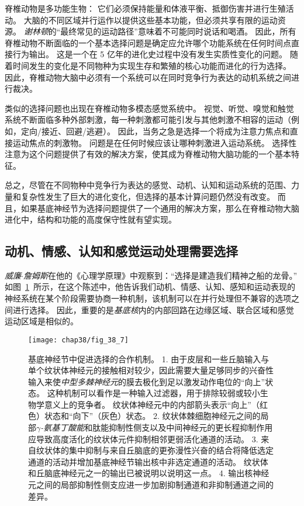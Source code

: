 脊椎动物是多功能生物：
它们必须保持能量和体液平衡、抵御伤害并进行生殖活动。
大脑的不同区域并行运作以提供这些基本功能，但必须共享有限的运动资源。
\textit{谢林顿}的“最终常见的运动路径”意味着不可能同时说话和喝酒。
因此，所有脊椎动物不断面临的一个基本选择问题是确定应允许哪个功能系统在任何时间点直接行为输出。
这是一个在 5 亿年的进化史过程中没有发生实质性变化的问题。
随着时间发生的变化是不同物种为实现生存和繁殖的核心功能而进化的行为选择。
因此，脊椎动物大脑中必须有一个系统可以在同时竞争行为表达的动机系统之间进行裁决。


类似的选择问题也出现在脊椎动物多模态感觉系统中。
视觉、听觉、嗅觉和触觉系统不断面临多种外部刺激，每一种刺激都可能引发与其他刺激不相容的运动（例如，定向/接近、回避/逃避）。
因此，当务之急是选择一个将成为注意力焦点和直接运动焦点的刺激物。
问题是在任何时候应该让哪种刺激进入运动系统。
选择性注意为这个问题提供了有效的解决方案，使其成为脊椎动物大脑功能的一个基本特征。


总之，尽管在不同物种中竞争行为表达的感觉、动机、认知和运动系统的范围、力量和复杂性发生了巨大的进化变化，但选择的基本计算问题仍然没有改变。
而且，如果基底神经节为选择问题提供了一个通用的解决方案，那么在脊椎动物大脑进化中，结构和功能的高度保守性就有望实现。



\subsection{动机、情感、认知和感觉运动处理需要选择}

\textit{威廉$\cdot$詹姆斯}在他的《心理学原理》中观察到：“选择是建造我们精神之船的龙骨。” 
如图~\ref{fig:38_7}~所示，在这个陈述中，他告诉我们动机、情感、认知、感知和运动表现的神经系统在某个阶段需要协商一种机制，该机制可以在并行处理但不兼容的选项之间进行选择。
因此，重要的是\textit{基底核}内的内部回路在边缘区域、联合区域和感觉运动区域是相似的。


\begin{figure}[htbp]
	\centering
	\texttt{[image: chap38/fig\_38\_7]}
	\caption{基底神经节中促进选择的合作机制。
		1. 由于皮层和一些丘脑输入与单个纹状体神经元的接触相对较少，因此需要大量足够同步的兴奋性输入来使\textit{中型多棘神经元}的膜去极化到足以激发动作电位的“向上”状态。
		这种机制可以看作是一种输入过滤器，用于排除较弱或较小生物学意义上的竞争者。
		纹状体神经元中的内部箭头表示“向上”（红色）状态和“向下”（灰色）状态。
		2. 纹状体棘细胞神经元之间的局部\textit{$\gamma$-氨基丁酸能}和肽能抑制性侧支以及中间神经元的更长程抑制作用应导致高度活化的纹状体元件抑制相邻更弱活化通道的活动。
		3. 来自纹状体的集中抑制与来自丘脑底的更弥漫性兴奋的结合将降低选定通道的活动并增加基底神经节输出核中非选定通道的活动。
		纹状体和丘脑底神经元之一的输出已被说明以说明这一点。
		4. 输出核神经元之间的局部抑制性侧支应进一步加剧抑制通道和非抑制通道之间的差异。}
	\label{fig:38_7}
\end{figure}


